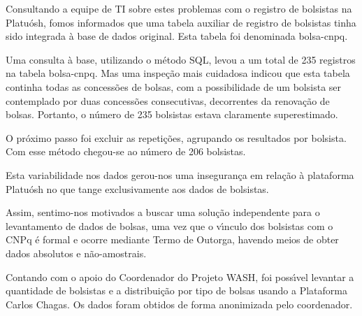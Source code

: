 \documentclass[
12pt,		%
openright,	%
twoside,  %
a4paper,			%
chapter=TITLE,		%
english,			%
french,				%
spanish,			%
brazil				%
]{USPSC-classe/USPSC_RedarTex}
\begin{document}
Consultando a equipe de TI sobre estes problemas com o registro de bolsistas na Platu\'osh, fomos informados que uma tabela auxiliar de registro de bolsistas tinha sido integrada \`a base de dados original. Esta tabela foi denominada \textquotedbl bolsa-cnpq\textquotedbl .










Uma consulta \`a base, utilizando o m\'etodo SQL, levou a um total de 235 registros na tabela \textquotedbl bolsa-cnpq\textquotedbl . Mas uma inspe\c{c}\~ao mais cuidadosa indicou que esta tabela continha todas as concess\~oes de bolsas, com a possibilidade de um bolsista ser contemplado por duas concess\~oes consecutivas, decorrentes da renova\c{c}\~ao de bolsas. Portanto, o n\'umero de 235 bolsistas estava claramente superestimado.










O pr\'oximo passo foi excluir as repeti\c{c}\~oes, agrupando os resultados por bolsista. Com esse m\'etodo chegou-se ao n\'umero de 206 bolsistas.










Esta variabilidade nos dados gerou-nos uma inseguran\c{c}a em rela\c{c}\~ao \`a plataforma Platu\'osh no que tange exclusivamente aos dados de bolsistas.










Assim, sentimo-nos motivados a buscar uma solu\c{c}\~ao independente para o levantamento de dados de bolsas, uma vez que o v\'{\i}nculo dos bolsistas com o CNPq \'e formal e ocorre mediante Termo de Outorga, havendo meios de obter dados absolutos e n\~ao-amostrais.










Contando com o apoio do Coordenador do Projeto WASH, foi poss\'{\i}vel levantar a quantidade de bolsistas e a distribui\c{c}\~ao por tipo de bolsas usando a Plataforma Carlos Chagas. Os dados foram obtidos de forma anonimizada pelo coordenador.
\end{document}

